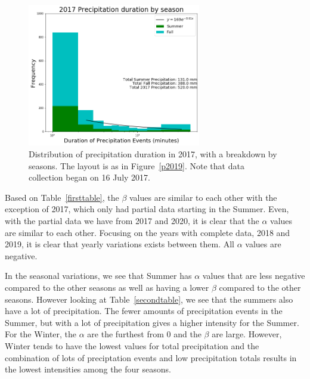 \documentclass[11pt]{report}
\begin{document}
\begin{figure}[b]
  \centering
  \includegraphics[width=0.675\textwidth]{Figures/precip_2017.png}
  \caption[Precipitation histogram for 2017 broken down by
    season]{\label{p2017} Distribution of precipitation duration in
    2017, with a breakdown by seasons. The layout is as in
    Figure~\ref{p2019}. Note that data collection began on 16 July
    2017.}
\end{figure}
\clearpage





Based on Table~\ref{firsttable}, the $\beta$ values are similar to
each other with the exception of 2017, which only had partial data
starting in the Summer. Even, with the partial data we have from 2017
and 2020, it is clear that the $\alpha$ values are similar to each
other. Focusing on the years with complete data, 2018 and 2019, it is
clear that yearly variations exists between them. All $\alpha$ values
are negative.

In the seasonal variations, we see that Summer has $\alpha$ values
that are less negative compared to the other seasons as well as having
a lower $\beta$ compared to the other seasons. However looking at
Table~\ref{secondtable}, we see that the summers also have a lot of
precipitation. The fewer amounts of precipitation events in the
Summer, but with a lot of precipitation gives a higher intensity for
the Summer. For the Winter, the $\alpha$ are the furthest from 0 and
the $\beta$ are large. However, Winter tends to have the lowest values
for total precipitation and the combination of lots of preciptation
events and low precipitation totals results in the lowest intensities
among the four seasons.
\end{document}
